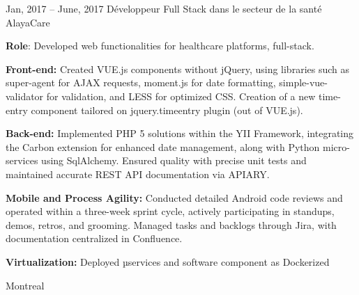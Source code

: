 \documentclass[
  a4paper,
   maincolor=cvblue,
   sectioncolor=cvblue,
   sidebarwidth=0.323\paperwidth,
]{fortysecondscv}
\begin{document}
\begin{cvtableNew}
  \cvitemRightNew
    {Jan, 2017 – June, 2017} %
    {Développeur Full Stack dans le secteur de la santé} %
    {AlayaCare} %
    {
      \vspace{0.1pt} %
      \fontsize{10.8pt}{12pt}\selectfont %
      \textbf{Role}: Developed web functionalities for healthcare platforms, full-stack.\par
      \vspace{4pt}
      \textbf{Front-end:} Created VUE.js components without jQuery, using libraries such as super-agent for AJAX requests, moment.js for date formatting, simple-vue-validator for validation, and LESS for optimized CSS. Creation of a new time-entry component tailored on jquery.timeentry plugin (out of VUE.js).\par
      \vspace{4pt}
      \textbf{Back-end:} Implemented PHP 5 solutions within the YII Framework, integrating the Carbon extension for enhanced date management, along with Python micro-services using SqlAlchemy. Ensured quality with precise unit tests and maintained accurate REST API documentation via APIARY.\par
      \vspace{4pt}
      \textbf{Mobile and Process Agility:} Conducted detailed Android code reviews and operated within a three-week sprint cycle, actively participating in standups, demos, retros, and grooming. Managed tasks and backlogs through Jira, with documentation centralized in Confluence.\par
      \vspace{4pt}
      \textbf{Virtualization:} Deployed µservices and software component as Dockerized\par
    }
    {Montreal} %

\vspace{2.2mm} %


\end{cvtableNew}
\end{document}
